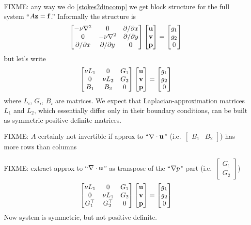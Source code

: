FIXME: any way we do \eqref{stokes2dincomp} we get block structure for the full system ``$A \mathbf{z} = \mathbf{f}$.''  Informally the structure is
  $$\begin{bmatrix}
    -\nu\nabla^2 & 0 & \partial/\partial x \\
    0 & -\nu\nabla^2 & \partial/\partial y \\
    \partial/\partial x & \partial/\partial y & 0
    \end{bmatrix}
    \begin{bmatrix}
    \mathbf{u} \\ \mathbf{v} \\ \mathbf{p}
    \end{bmatrix}
    =
    \begin{bmatrix}
    g_1 \\ g_2 \\ 0
    \end{bmatrix}
    $$
but let's write
  $$\begin{bmatrix}
    \nu L_1 & 0 & G_1 \\
    0 & \nu L_2 & G_2 \\
    B_1 & B_2 & 0
    \end{bmatrix}
    \begin{bmatrix}
    \mathbf{u} \\ \mathbf{v} \\ \mathbf{p}
    \end{bmatrix}
    =
    \begin{bmatrix}
    g_1 \\ g_2 \\ 0
    \end{bmatrix}
    $$
where $L_i$, $G_i$, $B_i$ are matrices.  We expect that Laplacian-approximation matrices $L_1$ and $L_2$, which essentially differ only in their boundary conditions, can be built as symmetric positive-definite matrices.

FIXME: $A$ certainly not invertible if approx to ``$\nabla\cdot \mathbf{u}$'' (i.e.~$\begin{bmatrix} B_1 & B_2 \end{bmatrix}$) has more rows than columns

FIXME: extract approx to ``$\nabla\cdot \mathbf{u}$'' as transpose of the ``$\nabla p$'' part (i.e.~$\begin{bmatrix} G_1 \\ G_2 \end{bmatrix}$)
    $$\begin{bmatrix}
    \nu L_1 & 0 & G_1 \\
    0 & \nu L_1 & G_2 \\
    G_1^\top & G_2^\top & 0
    \end{bmatrix}
    \begin{bmatrix}
    \mathbf{u} \\ \mathbf{v} \\ \mathbf{p}
    \end{bmatrix}
    =
    \begin{bmatrix}
    g_1 \\ g_2 \\ 0
    \end{bmatrix}$$
Now system is symmetric, but not positive definite.

